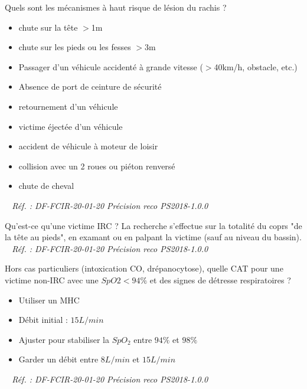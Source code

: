 \documentclass[grid,avery5371,landscape]{flashcards}
\makeatletter
\newcounter{nocarte}
\newcommand{\categ}[1]{%
  \def\@categ{#1}%
  \setcounter{nocarte}{0}%
}
\newcommand{\source}[1]{%
  \medskip
  \itshape%
   ~ \hfill Réf. : #1}
\makeatother
\begin{document}
\color[HTML]{003273}
\categ{PSE}
\begin{flashcard}[bilan]{
 Quels sont les mécanismes à haut risque de lésion du rachis ?   }
  \begin{itemize}
       \item chute sur la tête $>$1m
       \item chute sur les pieds ou les fesses $>$3m
       \item Passager d'un véhicule accidenté à grande vitesse ($>$40km/h, obstacle, etc.)
       \item Absence de port de ceinture de sécurité
       \item retournement d'un véhicule
       \item victime éjectée d'un véhicule
       \item accident de véhicule à moteur de loisir
       \item collision avec un 2 roues ou piéton renversé
       \item chute de cheval
   \end{itemize}
  \source{DF-FCIR-20-01-20 Précision reco PS2018-1.0.0}
\end{flashcard}


\color[HTML]{003273}
\categ{PSE}
\begin{flashcard}[bilan]{
 Qu'est-ce qu'une victime IRC ?   }
  La recherche s'effectue sur la totalité du coprs "de la tête au pieds", en examant ou en palpant la victime (sauf au niveau du bassin).
  \source{DF-FCIR-20-01-20 Précision reco PS2018-1.0.0}
\end{flashcard}


\color[HTML]{003273}
\categ{PSE}
\begin{flashcard}[CAT]{
 Hors cas particuliers (intoxication CO, drépanocytose), quelle CAT pour une victime non-IRC avec une $SpO2<94\%$ et des signes de détresse respiratoires ?   }
  \begin{itemize}
       \item Utiliser un MHC
       \item Débit initial : $15L/min$
       \item Ajuster pour stabiliser la $SpO_2$ entre $94\%$ et $98\%$
       \item Garder un débit entre $8L/min$ et $15L/min$
   \end{itemize}
  \source{DF-FCIR-20-01-20 Précision reco PS2018-1.0.0}
\end{flashcard}
\end{document}
